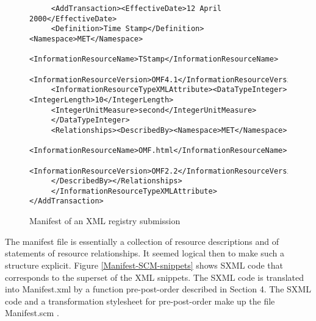 \documentclass[10pt]{llncs}
\begin{document}
\begin{figure}
\begin{verbatim}
     <AddTransaction><EffectiveDate>12 April 2000</EffectiveDate>
     <Definition>Time Stamp</Definition><Namespace>MET</Namespace>
     <InformationResourceName>TStamp</InformationResourceName>
     <InformationResourceVersion>OMF4.1</InformationResourceVersion>
     <InformationResourceTypeXMLAttribute><DataTypeInteger><IntegerLength>10</IntegerLength>
     <IntegerUnitMeasure>second</IntegerUnitMeasure>
     </DataTypeInteger>
     <Relationships><DescribedBy><Namespace>MET</Namespace>
     <InformationResourceName>OMF.html</InformationResourceName>
     <InformationResourceVersion>OMF2.2</InformationResourceVersion>
     </DescribedBy></Relationships>
     </InformationResourceTypeXMLAttribute></AddTransaction>
\end{verbatim}
\caption{\label{Manifest-XML-snippets}Manifest of an XML registry submission}\end{figure}
The manifest file is essentially a collection of resource
descriptions and of statements of resource relationships. It seemed
logical then to make such a structure explicit. Figure \ref{Manifest-SCM-snippets} shows SXML code that corresponds to the
superset of the XML snippets. The SXML code is translated into
Manifest.xml by a function pre-post-order described in Section 4. The
SXML code and a transformation stylesheet for pre-post-order make up
the file Manifest.scm \cite{Manifest-SCM}.
\end{document}

